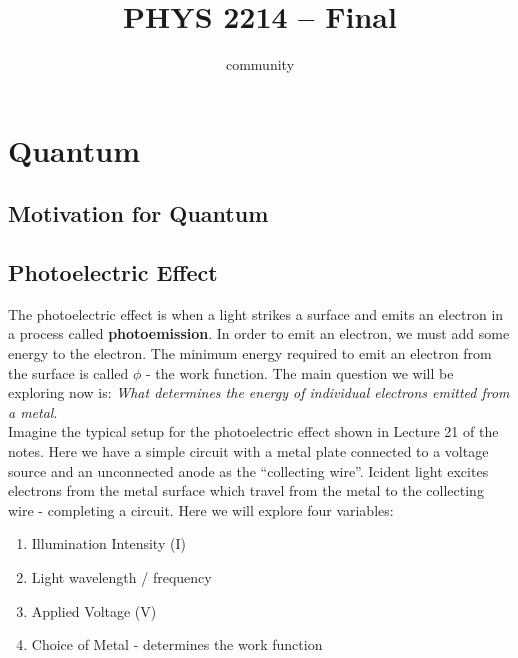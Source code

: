 \documentclass{hw} \title{PHYS 2214 -- Final} \author{community}
\numberwithin{equation}{section}
\begin{document}
\section{Quantum}

\subsection{Motivation for Quantum}

\subsection{Photoelectric Effect} The photoelectric effect is when a light
strikes a surface and emits an electron in a process called
\textbf{photoemission}. In order to emit an electron, we must add some energy
to the electron. The minimum energy required to emit an electron from the
surface is called $\phi$ - the work function. The main question we will be
exploring now is: \textit{What determines the energy of individual electrons
emitted from a metal}. \\

Imagine the typical setup for the photoelectric effect shown in Lecture 21 of
the notes. Here we have a simple circuit with a metal plate connected to a
voltage source and an unconnected anode as the ``collecting wire''. Icident
light excites electrons from the metal surface which travel from the metal to
the collecting wire - completing a circuit. Here we will explore four
variables:

\begin{enumerate}
  \item Illumination Intensity (I)
  \item Light wavelength / frequency
  \item Applied Voltage (V)
  \item Choice of Metal - determines the work function
\end{enumerate}
\end{document}
